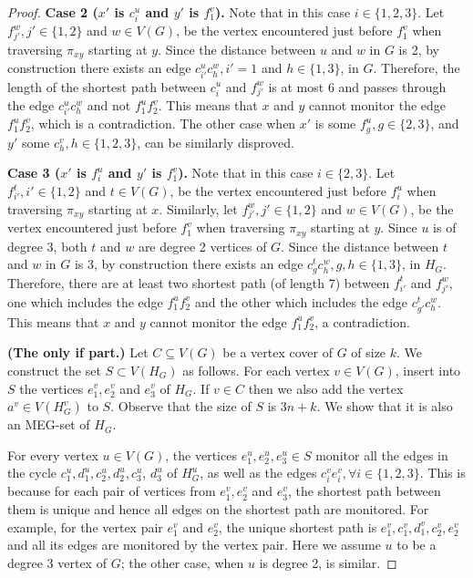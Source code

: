 \documentclass[10pt,a4paper]{article}
\begin{document}
\begin{proof}
    \smallskip \noindent \textbf{Case 2 ($x'$ is $c_i^u$ and $y'$ is $f_1^v$).} Note that in this case $i \in \{1,2,3\}$. Let $f_{j'}^w, j' \in \{1,2\}$ and $w \in V(G)$, be the vertex encountered just before $f_1^v$ when traversing $\pi_{xy}$ starting at $y$. Since the distance between $u$ and $w$ in $G$ is 2, by construction there exists an edge $c_{i'}^u c_h^w, i' = 1$ and $h \in \{1, 3\}$, in $G$. Therefore, the length of the shortest path between $c_i^u$ and $f_{j'}^w$ is at most 6 and passes through the edge $c_{i'}^u c_h^w$ and not $f_1^u f_2^v$. This means that $x$ and $y$ cannot monitor the edge $f_1^u f_2^v$, which is a contradiction. The other case when $x'$ is some $f_{g}^u, g \in \{2, 3\}$, and $y'$ some $c_{h}^v, h \in \{1,2,3\}$, can be similarly disproved.

    \smallskip \noindent \textbf{Case 3 ($x'$ is $f_i^u$ and $y'$ is $f_1^v$).} Note that in this case $i \in \{2, 3\}$. Let $f_{i'}^t, i' \in \{1,2\}$ and $t \in V(G)$, be the vertex encountered just before $f_i^u$ when traversing $\pi_{xy}$ starting at $x$. Similarly, let $f_{j'}^w, j' \in \{1,2\}$ and $w \in V(G)$, be the vertex encountered just before $f_1^v$ when traversing $\pi_{xy}$ starting at $y$. Since $u$ is of degree 3, both $t$ and $w$ are degree 2 vertices of $G$. Since the distance between $t$ and $w$ in $G$ is 3, by construction there exists an edge $c_g^t c_h^w, g, h \in \{1, 3\}$, in $H_G$. Therefore, there are at least two shortest path (of length 7) between $f_{i'}^t$ and $f_{j'}^w$, one which includes the edge $f_1^u f_2^v$ and the other which includes the edge $c_{g'}^t c_h^w$. This means that $x$ and $y$ cannot monitor the edge $f_1^u f_2^v$, a contradiction.

    \smallskip \noindent \textbf{(The only if part.)} Let $C \subseteq V(G)$ be a vertex cover of $G$ of size $k$. We construct the set $S \subset V(H_G)$ as follows. For each vertex $v \in V(G)$, insert into $S$ the vertices $e_1^v, e_2^v$ and $e_3^v$ of $H_G$. If $v \in C$ then we also add the vertex $a^v \in V(H_G^v)$ to $S$. Observe that the size of $S$ is $3n +k$. We show that it is also an MEG-set of $H_G$.

    For every vertex $u \in V(G)$, the vertices $e_1^u, e_2^u, e_3^u \in S$ monitor all the edges in the cycle $c_1^u, d_1^u, c_2^u, d_2^u, c_3^u$, $d_3^u$ of $H_G^u$, as well as the edges $c_i^v e_i^v, \forall i \in \{1,2,3\}$. This is because for each pair of vertices from $e_1^v, e_2^v$ and $e_3^v$, the shortest path between them is unique and hence all edges on the shortest path are monitored. For example, for the vertex pair $e_1^v$ and $e_2^v$, the unique shortest path is $e_1^v, c_1^v, d_1^v, c_2^v, e_2^v$ and all its edges are monitored by the vertex pair. Here we assume $u$ to be a degree 3 vertex of $G$; the other case, when $u$ is degree 2, is similar.
    

\end{proof}
\end{document}
